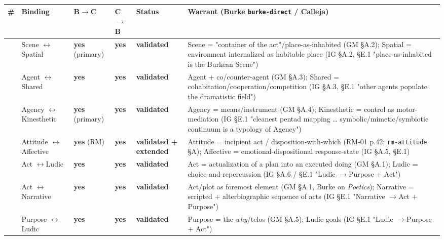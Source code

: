 \documentclass[11pt]{report}
\begin{document}
\begin{table}[H]
\footnotesize
\setlength{\tabcolsep}{4pt}
\renewcommand{\arraystretch}{1.25}
\begin{tabularx}{\textwidth}{>{\RaggedRight\arraybackslash}X>{\RaggedRight\arraybackslash}X>{\RaggedRight\arraybackslash}X>{\RaggedRight\arraybackslash}X>{\RaggedRight\arraybackslash}X>{\RaggedRight\arraybackslash}X}
\toprule
\# & Binding & B$\rightarrow$\allowbreak C & C$\rightarrow$\allowbreak B & Status & Warrant (Burke \texttt{burke-\discretionary{}{}{}direct} / Calleja) \\
\midrule
1 & Scene $\leftrightarrow$\allowbreak  Spatial & \textbf{yes} (primary) & \textbf{yes} & \textbf{validated} & Scene = "container of the act"/place-as-inhabited (GM §A.2); Spatial = environment internalized as habitable place (IG §A.2, §E.1 "place-as-inhabited is the Burkean Scene") \\
2 & Agent $\leftrightarrow$\allowbreak  Shared & \textbf{yes} & \textbf{yes} & \textbf{validated} & Agent + co/counter-agent (GM §A.3); Shared = cohabitation/cooperation/competition (IG §A.3, §E.1 "other agents populate the dramatistic field") \\
3 & Agency $\leftrightarrow$\allowbreak  Kinesthetic & \textbf{yes} (primary) & \textbf{yes} & \textbf{validated} & Agency = means/instrument (GM §A.4); Kinesthetic = control as motor-mediation (IG §E.1 "cleanest pentad mapping … symbolic/mimetic/symbiotic continuum is a typology of Agency") \\
4 & Attitude $\leftrightarrow$\allowbreak  Affective & \textbf{yes} (RM) & \textbf{yes} & \textbf{validated + extended} & Attitude = incipient act / disposition-with-which (RM-01 p.42; \texttt{rm-\discretionary{}{}{}attitude} §A); Affective = emotional-dispositional response-state (IG §A.5, §E.1) \\
5 & Act $\leftrightarrow$\allowbreak  Ludic & \textbf{yes} & \textbf{yes} & \textbf{validated} & Act = actualization of a plan into an executed doing (GM §A.1); Ludic = choice-and-repercussion (IG §A.6 / §E.1 "Ludic $\rightarrow$\allowbreak  Purpose + Act") \\
6 & Act $\leftrightarrow$\allowbreak  Narrative & \textbf{yes} & \textbf{yes} & \textbf{validated} & Act/plot as foremost element (GM §A.1, Burke on \textit{Poetics}); Narrative = scripted + alterbiographic sequence of acts (IG §E.1 "Narrative $\rightarrow$\allowbreak  Act + Purpose") \\
7 & Purpose $\leftrightarrow$\allowbreak  Ludic & \textbf{yes} & \textbf{yes} & \textbf{validated} & Purpose = the \textit{why}/telos (GM §A.5); Ludic goals (IG §E.1 "Ludic $\rightarrow$\allowbreak  Purpose + Act") \\

\end{tabularx}
\end{table}
\end{document}
